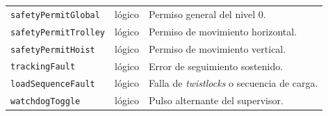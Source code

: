 \documentclass[a4paper,10pt,onecolumn,journal]{ieeeconf}
\numberwithin{equation}{section}
\begin{document}
{\begin{table}[H]
\begin{tabular}{L{4.3cm} L{2.4cm} L{7.0cm}}
\texttt{safetyPermitGlobal} & lógico & Permiso general del nivel 0.\\
\texttt{safetyPermitTrolley} & lógico & Permiso de movimiento horizontal.\\
\texttt{safetyPermitHoist} & lógico & Permiso de movimiento vertical.\\
\texttt{trackingFault} & lógico & Error de seguimiento sostenido.\\
\texttt{loadSequenceFault} & lógico & Falla de \textit{twistlocks} o secuencia de carga.\\
\texttt{watchdogToggle} & lógico & Pulso alternante del supervisor.\\
\bottomrule
\end{tabular}
\end{table}
}

\par
{}
\end{document}
